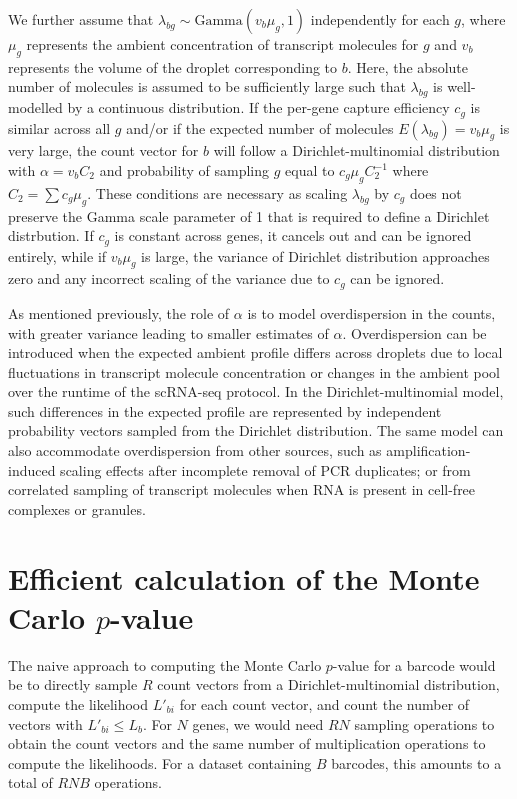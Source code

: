 \documentclass{article}
\begin{document}
We further assume that $\lambda_{bg} \sim \mbox{Gamma}(v_b\mu_g, 1)$ independently for each $g$, 
where $\mu_g$ represents the ambient concentration of transcript molecules for $g$ and $v_b$ represents the volume of the droplet corresponding to $b$.
Here, the absolute number of molecules is assumed to be sufficiently large such that $\lambda_{bg}$ is well-modelled by a continuous distribution.
If the per-gene capture efficiency $c_g$ is similar across all $g$ and/or if the expected number of molecules $E(\lambda_{bg})=v_b\mu_g$ is very large, the count vector for $b$ will follow a Dirichlet-multinomial distribution with $\alpha = v_b C_2$ and probability of sampling $g$ equal to $c_g\mu_g C_2^{-1}$ where $C_2 = \sum c_g\mu_g$.
These conditions are necessary as scaling $\lambda_{bg}$ by $c_g$ does not preserve the Gamma scale parameter of 1 that is required to define a Dirichlet distrbution.
If $c_g$ is constant across genes, it cancels out and can be ignored entirely, while if $v_b\mu_g$ is large, the variance of Dirichlet distribution approaches zero and any incorrect scaling of the variance due to $c_g$ can be ignored.

As mentioned previously, the role of $\alpha$ is to model overdispersion in the counts, with greater variance leading to smaller estimates of $\alpha$.
Overdispersion can be introduced when the expected ambient profile differs across droplets due to local fluctuations in transcript molecule concentration or changes in the ambient pool over the runtime of the scRNA-seq protocol.
In the Dirichlet-multinomial model, such differences in the expected profile are represented by independent probability vectors sampled from the Dirichlet distribution.
The same model can also accommodate overdispersion from other sources, such as amplification-induced scaling effects after incomplete removal of PCR duplicates;
or from correlated sampling of transcript molecules when RNA is present in cell-free complexes or granules.

\section{Efficient calculation of the Monte Carlo $p$-value}
The naive approach to computing the Monte Carlo $p$-value for a barcode would be to directly sample $R$ count vectors from a Dirichlet-multinomial distribution,
compute the likelihood $L'_{bi}$ for each count vector, and count the number of vectors with $L'_{bi} \le L_{b}$.
For $N$ genes, we would need $RN$ sampling operations to obtain the count vectors and the same number of multiplication operations to compute the likelihoods.
For a dataset containing $B$ barcodes, this amounts to a total of $RNB$ operations.
\end{document}
